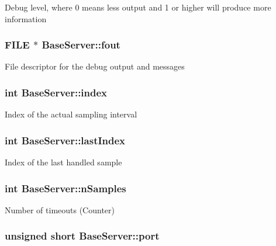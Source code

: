 Debug level, where 0 means less output and 1 or higher will produce more information \hypertarget{classBaseServer_a9ad43261a042fbeeafee33ca4c0b3fd3}{
\subsubsection[{fout}]{\setlength{\rightskip}{0pt plus 5cm}F\-I\-L\-E $\ast$ Base\-Server\-::fout\hspace{0.3cm}{\ttfamily [protected]}}}\label{classBaseServer_a9ad43261a042fbeeafee33ca4c0b3fd3}
File descriptor for the debug output and messages \hypertarget{classBaseServer_a19c0599639c04521eef256b0c3215c5f}{
\subsubsection[{index}]{\setlength{\rightskip}{0pt plus 5cm}int Base\-Server\-::index\hspace{0.3cm}{\ttfamily [protected]}}}\label{classBaseServer_a19c0599639c04521eef256b0c3215c5f}
Index of the actual sampling interval \hypertarget{classBaseServer_ae6bf1d5aaa70401472f0a355887ab007}{
\subsubsection[{last\-Index}]{\setlength{\rightskip}{0pt plus 5cm}int Base\-Server\-::last\-Index\hspace{0.3cm}{\ttfamily [protected]}}}\label{classBaseServer_ae6bf1d5aaa70401472f0a355887ab007}
Index of the last handled sample \hypertarget{classBaseServer_aa62931fdc3513ffb3e39efb1f1a412b5}{
\subsubsection[{n\-Samples}]{\setlength{\rightskip}{0pt plus 5cm}int Base\-Server\-::n\-Samples\hspace{0.3cm}{\ttfamily [protected]}}}\label{classBaseServer_aa62931fdc3513ffb3e39efb1f1a412b5}
Number of timeouts (Counter) \hypertarget{classBaseServer_a66052c095234e31cada29b678b039c68}{
\subsubsection[{port}]{\setlength{\rightskip}{0pt plus 5cm}unsigned short Base\-Server\-::port\hspace{0.3cm}{\ttfamily [protected]}}}\label{classBaseServer_a66052c095234e31cada29b678b039c68}
